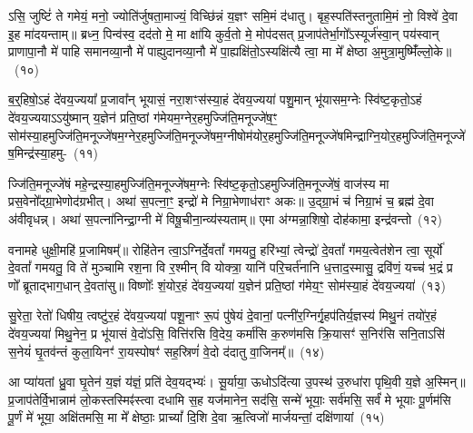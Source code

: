 ऽसि॒ जुष्टिं॑ ते गमेयं॒ मनो॒ ज्योति॑र्जुषता॒माज्यं॒ विच्छि॑न्नं य॒ज्ञꣳ समि॒मं द॑धातु। बृह॒स्पति॑स्तनुतामि॒मं नो॒ विश्वे॑ दे॒वा इ॒ह मा॑दयन्ताम्॥ ब्रध्न॒ पिन्व॑स्व॒ दद॑तो मे॒ मा क्षा॑यि कुर्व॒तो मे॒ मोप॑दसत् प्र॒जा\-प॑तेर्भा॒गो᳚\-ऽस्यूर्ज॑स्वा॒न् पय॑स्वान् प्राणापा॒नौ मे॑ पाहि समानव्या॒नौ मे॑ पाह्युदानव्या॒नौ मे॑ पा॒ह्यक्षि॑तो॒\-ऽस्यक्षि॑त्यै त्वा॒ मा मे᳚ क्षेष्ठा अ॒मुत्रा॒मुष्मिँ॑ल्लो॒के॥~(१०)\ip

{\anuvakamend[{उ॒प॒ह॒वं जुष्टा॑ नस्त्वा॒ षट् च॑}]}

ब॒र्॒\mbox{}हिषो॒\-ऽहं दे॑वय॒ज्यया᳚ प्र॒जावा᳚न् भूयासं॒ नरा॒शꣳस॑स्या॒हं दे॑वय॒ज्यया॑ पशु॒मान् भू॑यासम॒ग्नेः स्वि॑ष्ट॒कृतो॒\-ऽहं दे॑वय॒ज्यया\-ऽऽ\-यु॑ष्मान् य॒ज्ञेन॑ प्रति॒ष्ठां ग॑मेयम॒ग्ने\-र॒हमुज्जि॑ति॒\-मनूज्जे॑ष॒ꣳ॒ सोम॑\-स्या॒\-हमुज्जि॑ति॒\-मनूज्जे॑षम॒ग्नेर॒हमुज्जि॑ति॒\-मनूज्जे॑षम॒ग्नी\-षोम॑यो\-र॒ह\-मु\-ज्जि॑ति॒\-मनूज्जे॑ष\-मिन्द्राग्नि॒यो\-र॒हमुज्जि॑ति॒\-मनूज्जे॑ष॒\-मिन्द्र॑स्या॒हमु-~(११)\ip

ज्जि॑ति॒मनूज्जे॑षं महे॒न्द्रस्या॒हमुज्जि॑ति॒\-मनूज्जे॑षम॒ग्नेः स्वि॑ष्ट॒कृतो॒\-ऽहमुज्जि॑ति॒मनूज्जे॑षं॒ वाज॑स्य मा प्रस॒वेनो᳚द्ग्रा॒भेणोद॑\-ग्रभीत्। अथा॑ स॒पत्ना॒ꣳ॒ इन्द्रो॑ मे निग्रा॒भेणाध॑राꣳ अकः॥ उ॒द्ग्रा॒भं च॑ निग्रा॒भं च॒ ब्रह्म॑ दे॒वा अ॑वीवृधन्न्। अथा॑ स॒पत्ना॑निन्द्रा॒ग्नी मे॑ विषू॒चीना॒न्व्य॑स्यताम्॥ एमा अ॑ग्मन्ना॒शिषो॒ दोह॑कामा॒ इन्द्र॑वन्तो~(१२)\ip

वनामहे धुक्षी॒महि॑ प्र॒जामिषम्᳚॥ रोहि॑तेन त्वा॒\-ऽग्निर्दे॒वतां᳚ गमयतु॒ हरि॑भ्यां॒ त्वेन्द्रो॑ दे॒वतां᳚ गमय॒त्वेत॑शेन त्वा॒ सूर्यो॑ दे॒वतां᳚ गमयतु॒ वि ते॑ मुञ्चामि रश॒ना वि र॒श्मीन् वि योक्त्रा॒ यानि॑ परि॒चर्त॑नानि ध॒त्ताद॒स्मासु॒ द्रवि॑णं॒ यच्च॑ भ॒द्रं प्र णो᳚ ब्रूताद्भाग॒धान् दे॒वता॑सु॥ विष्णोः᳚ शं॒योर॒हं दे॑वय॒ज्यया॑ य॒ज्ञेन॑ प्रति॒ष्ठां ग॑मेय॒ꣳ॒ सोम॑स्या॒हं दे॑वय॒ज्यया॑~(१३)\ip

सु॒रेता॒ रेतो॑ धिषीय॒ त्वष्टु॑र॒हं दे॑वय॒ज्यया॑ पशू॒नाꣳ रू॒पं पु॑षेयं दे॒वानां॒ पत्नी॑र॒ग्निर्गृ॒ह\-प॑तिर्य॒ज्ञस्य॑ मिथु॒नं तयो॑र॒हं दे॑वय॒ज्यया॑ मिथु॒नेन॒ प्र भू॑यासं वे॒दो॑\-ऽसि॒ वित्ति॑रसि वि॒देय॒ कर्मा॑सि क॒रुण॑मसि क्रि॒यासꣳ॑ स॒निर॑सि सनि॒ता\-ऽसि॑ स॒नेयं॑ घृ॒तव॑न्तं कुला॒यिनꣳ॑ रा॒यस्पोषꣳ॑ सह॒स्रिणं॑ वे॒दो द॑दातु वा॒जिनम्᳚॥~(१४)\ip

{\anuvakamend[{इन्द्र॑स्या॒हमिन्द्र॑वन्तः॒ सोम॑स्या॒हं दे॑वय॒ज्यया॒ चतु॑श्चत्वारिꣳशच्च}]}

आ प्या॑यतां ध्रु॒वा घृ॒तेन॑ य॒ज्ञं य॑ज्ञं॒ प्रति॑ देव॒यद्भ्यः॑। सू॒र्याया॒ ऊधो\-ऽदि॑त्या उ॒पस्थ॑ उ॒रुधा॑रा पृथि॒वी य॒ज्ञे अ॒स्मिन्॥ प्र॒जा\-प॑तेर्वि॒भान्नाम॑ लो॒कस्तस्मिꣴ॑स्त्वा दधामि स॒ह यज॑मानेन॒ सद॑सि॒ सन्मे॑ भूयाः॒ सर्व॑मसि॒ सर्वं॑ मे भूयाः पू॒र्णम॑सि पू॒र्णं मे॑ भूया॒ अक्षि॑तमसि॒ मा मे᳚ क्षेष्ठाः॒ प्राच्यां᳚ दि॒शि दे॒वा ऋ॒त्विजो॑ मार्जयन्तां॒ दक्षि॑णायां~(१५)\ip


